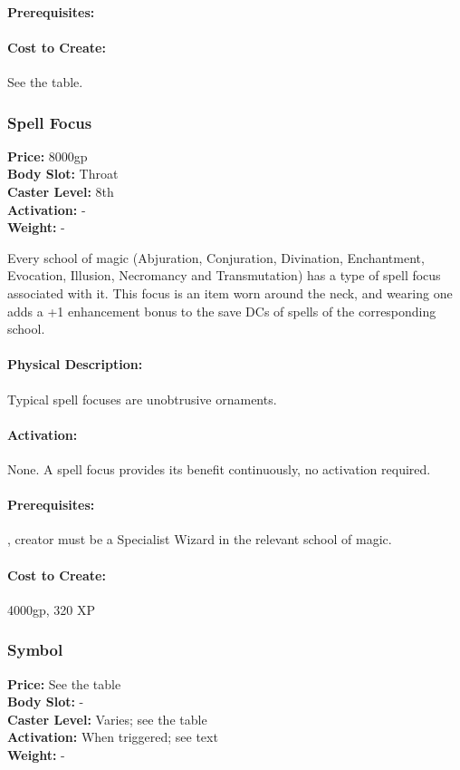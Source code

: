 \paragraph{Prerequisites:} 

\paragraph{Cost to Create:} See the  table.
\subsubsection{Spell Focus}
\textbf{Price:} 8000gp\\
\textbf{Body Slot:} Throat\\
\textbf{Caster Level:} 8th\\
\textbf{Activation:} -\\
\textbf{Weight:} -

Every school of magic (Abjuration, Conjuration, Divination, Enchantment, Evocation, Illusion, Necromancy and Transmutation) has a type of spell focus associated with it. This focus is an item worn around the neck, and wearing one adds a +1 enhancement bonus to the save DCs of spells of the corresponding school.

\paragraph{Physical Description:} Typical spell focuses are unobtrusive ornaments.

\paragraph{Activation:} None. A spell focus provides its benefit continuously, no activation required.

\paragraph{Prerequisites:} , creator must be a Specialist Wizard in the relevant school of magic.

\paragraph{Cost to Create:} 4000gp, 320 XP
\subsubsection{Symbol}
\textbf{Price:} See the  table\\
\textbf{Body Slot:} -\\
\textbf{Caster Level:} Varies; see the  table\\
\textbf{Activation:} When triggered; see text\\
\textbf{Weight:} -

